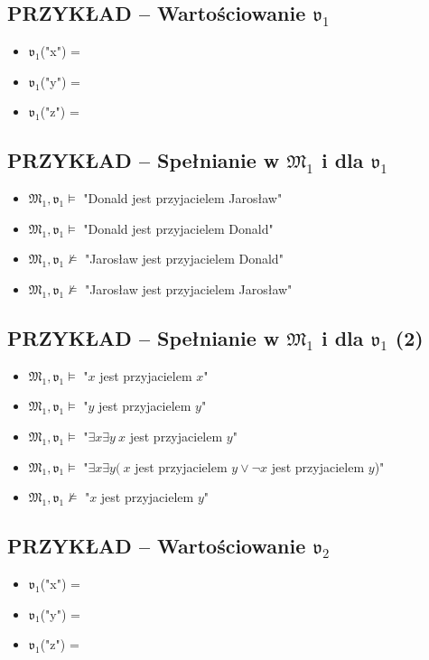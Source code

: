 \documentclass[12pt]{article}
\begin{document}
\subsection{PRZYKŁAD -- Wartościowanie $\mathfrak{v}_1$}
%
\begin{itemize}
\item $\mathfrak{v}_1$("x") = \smiley{}
\item $\mathfrak{v}_1$("y") = \smiley{}
\item $\mathfrak{v}_1$("z") = \smiley{}
\end{itemize}
%

\subsection{PRZYKŁAD -- Spełnianie w $\mathfrak{M}_1$ i dla $\mathfrak{v}_1$}
%
\begin{itemize}
\item $\mathfrak{M}_1,\mathfrak{v}_1 \vDash$ "Donald jest przyjacielem Jarosław"%
\item $\mathfrak{M}_1,\mathfrak{v}_1 \vDash$ "Donald jest przyjacielem Donald"%
\item $\mathfrak{M}_1,\mathfrak{v}_1 \not \vDash$ "Jarosław jest przyjacielem Donald"%
\item $\mathfrak{M}_1,\mathfrak{v}_1 \not \vDash$ "Jarosław jest przyjacielem Jarosław"
\end{itemize}
%

\subsection{PRZYKŁAD -- Spełnianie w $\mathfrak{M}_1$ i dla $\mathfrak{v}_1$ (2)}
%
\begin{itemize}
\item $\mathfrak{M}_1,\mathfrak{v}_1 \vDash$ "$x$ jest przyjacielem $x$"%
\item $\mathfrak{M}_1,\mathfrak{v}_1 \vDash$ "$y$ jest przyjacielem $y$"%
\item $\mathfrak{M}_1,\mathfrak{v}_1 \vDash$ "$\exists x \exists y ~x$ jest przyjacielem $y$"%
\item $\mathfrak{M}_1,\mathfrak{v}_1 \vDash$ "$\exists x \exists y ( ~x$ jest przyjacielem $y \lor \neg x$ jest przyjacielem $y$)"%
\item $\mathfrak{M}_1,\mathfrak{v}_1 \not \vDash$ "$x$ jest przyjacielem $y$"
\end{itemize}
%

\subsection{PRZYKŁAD -- Wartościowanie $\mathfrak{v}_2$}
%
\begin{itemize}
\item $\mathfrak{v}_1$("x") = \smiley{}
\item $\mathfrak{v}_1$("y") = \frownie{}
\item $\mathfrak{v}_1$("z") = \blacksmiley{}
\end{itemize}
%
\end{document}
